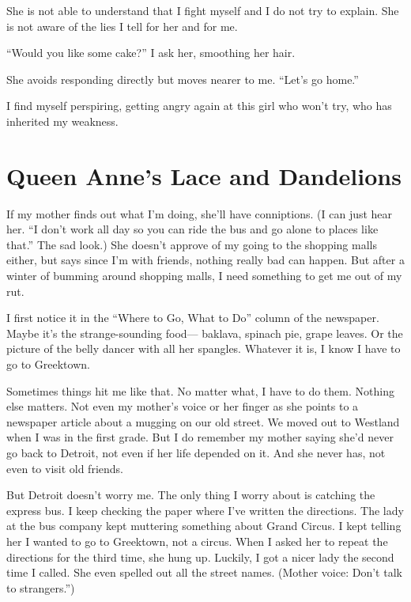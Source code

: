 \documentclass[twoside,10pt]{book}
\begin{document}
She is not able to understand that I fight myself and I do not try to
explain. She is not aware of the lies I tell for her and for me.

``Would you like some cake?'' I ask her, smoothing her hair.

She avoids responding directly but moves nearer to me. ``Let's go
home.''

I find myself perspiring, getting angry again at this girl who won't
try, who has inherited my weakness.





\cleardoublepage
\chapter{Queen Anne's Lace and Dandelions}

If my mother finds out what I'm doing, she'll have conniptions. (I can
just hear her. ``I don't work all day so you can ride the bus and go
alone to places like that.'' The sad look.) She doesn't approve of my
going to the shopping malls either, but says since I'm with friends,
nothing really bad can happen. But after a winter of bumming around
shopping malls, I need something to get me out of my rut.

I first notice it in the ``Where to Go, What to Do'' column of the
newspaper. Maybe it's the strange-sounding food--- baklava, spinach pie,
grape leaves. Or the picture of the belly dancer with all her spangles.
Whatever it is, I know I have to go to Greektown.

Sometimes things hit me like that. No matter what, I have to do them.
Nothing else matters. Not even my mother's voice or her finger as she
points to a newspaper article about a mugging on our old street. We
moved out to Westland when I was in the first grade. But I do remember
my mother saying she'd never go back to Detroit, not even if her life
depended on it. And she never has, not even to visit old friends.

But Detroit doesn't worry me. The only thing I worry about is catching
the express bus. I keep checking the paper where I've written the
directions. The lady at the bus company kept muttering something about
Grand Circus. I kept telling her I wanted to go to Greektown, not a
circus. When I asked her to repeat the directions for the third time,
she hung up. Luckily, I got a nicer lady the sec­ond time I called. She
even spelled out all the street names. (Mother voice: Don't talk to
strangers.'')
\end{document}
